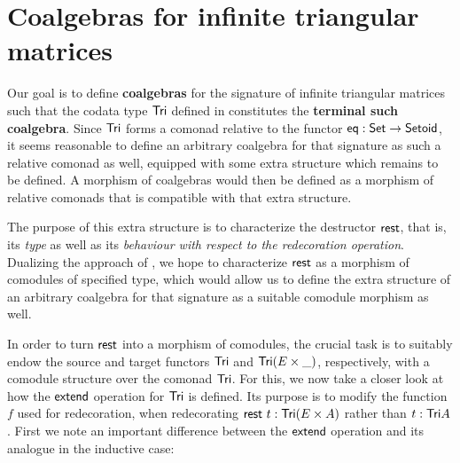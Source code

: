 \documentclass{amsart}
\newcommand{\fat}[1]{\textbf{#1}}
\begin{document}
\section{Coalgebras for infinite triangular matrices}\label{sec:coalgebras_for_tri}


Our goal is to define \fat{coalgebras} for the signature of infinite triangular matrices such that 
the codata type $\mathsf{Tri}$ defined in  constitutes the \fat{terminal such coalgebra}.
Since $\mathsf{Tri}$ forms a comonad relative to the functor $\mathsf{eq}:\mathsf{Set}\to\mathsf{Setoid}$, it seems reasonable to define
an arbitrary coalgebra for that signature as such a relative comonad as well, equipped with some extra structure which remains to be defined.
A morphism of coalgebras would then be defined as a morphism of relative comonads that is compatible with that extra structure.

The purpose of this extra structure is to characterize the destructor $\mathsf{rest}$, that is, its \emph{type} as well as
its \emph{behaviour with respect to the redecoration operation}.
Dualizing the approach of \textcite{DBLP:journals/iandc/HirschowitzM10}, we hope to characterize $\mathsf{rest}$ as a morphism of 
comodules of specified type, which would allow us to define the extra structure of an arbitrary coalgebra for that signature
as a suitable comodule morphism as well.

In order to turn $\mathsf{rest}$ into a morphism of comodules, the crucial task is to suitably endow the source and target functors
$\mathsf{Tri}$ and $\mathsf{Tri}(E\times \_)$, respectively, with a comodule structure over the comonad $\mathsf{Tri}$.
For this, we now take a closer look at how the $\mathsf{extend}$ operation for $\mathsf{Tri}$ is defined. Its purpose is to 
modify the function $f$ used for redecoration, when redecorating $\mathsf{rest}~t : \mathsf{Tri}(E\times A)$ rather than $t : \mathsf{Tri} A$.
First we note an important difference between the $\mathsf{extend}$ operation and its analogue in the inductive case:
\end{document}
